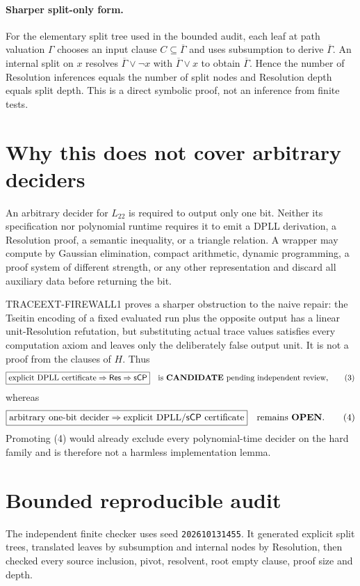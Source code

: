 \documentclass[11pt]{article}
\newcommand{\Ltwo}{L_{22}}
\newcommand{\Res}{\mathsf{Res}}
\newcommand{\sCP}{\mathsf{sCP}}
\newcommand{\CAND}{\textbf{CANDIDATE}}
\newcommand{\OPEN}{\textbf{OPEN}}
\begin{document}
\paragraph{Sharper split-only form.}
For the elementary split tree used in the bounded audit, each leaf at path
valuation $\Gamma$ chooses an input clause $C\subseteq\overline\Gamma$ and
uses subsumption to derive $\overline\Gamma$.  An internal split on $x$
resolves
$\overline\Gamma\vee\neg x$ with
$\overline\Gamma\vee x$ to obtain $\overline\Gamma$.  Hence the number of
Resolution inferences equals the number of split nodes and Resolution depth
equals split depth.  This is a direct symbolic proof, not an inference from
finite tests.

\section{Why this does not cover arbitrary deciders}
An arbitrary decider for $\Ltwo$ is required to output only one bit.  Neither
its specification nor polynomial runtime requires it to emit a DPLL
derivation, a Resolution proof, a semantic inequality, or a triangle
relation.  A wrapper may compute by Gaussian elimination, compact arithmetic,
dynamic programming, a proof system of different strength, or any other
representation and discard all auxiliary data before returning the bit.

TRACEEXT-FIREWALL1 proves a sharper obstruction to the naive repair: the
Tseitin encoding of a fixed evaluated run plus the opposite output has a
linear unit-Resolution refutation, but substituting actual trace values
satisfies every computation axiom and leaves only the deliberately false
output unit.  It is not a proof from the clauses of $H$.  Thus
\[
 \boxed{
 \text{explicit DPLL certificate}\Rightarrow\Res\Rightarrow\sCP
 }
 \quad\text{is \CAND{} pending independent review,}        \tag{3}
\]
whereas
\[
 \boxed{
 \text{arbitrary one-bit decider}\Rightarrow
 \text{explicit DPLL/$\sCP$ certificate}
 }
 \quad\text{remains \OPEN{}.}                              \tag{4}
\]
Promoting (4) would already exclude every polynomial-time decider on the hard
family and is therefore not a harmless implementation lemma.

\section{Bounded reproducible audit}
The independent finite checker
 uses seed
\texttt{202610131455}.  It generated explicit split trees, translated leaves
by subsumption and internal nodes by Resolution, then checked every source
inclusion, pivot, resolvent, root empty clause, proof size and depth.
\end{document}
